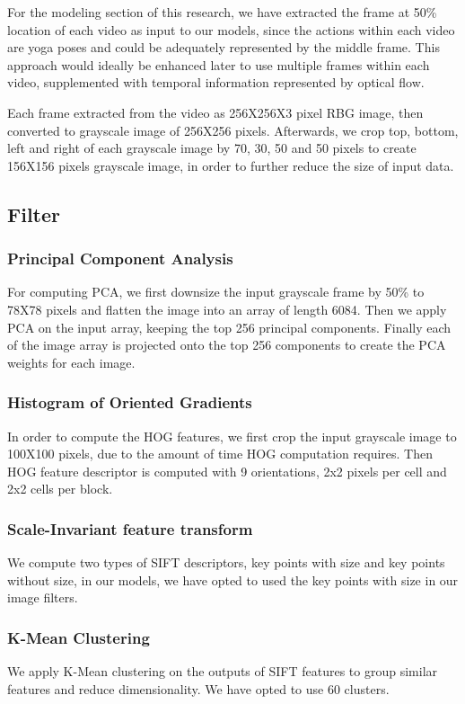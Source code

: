 \documentclass[
	a4paper, %
	10pt, %
	unnumberedsections, %
	twoside, %
]{t0004}
\begin{document}
For the modeling section of this research, we have extracted the frame at 50\% location of each video as input to our models, since the actions within each video are yoga poses and could be adequately represented by the middle frame. This approach would ideally be enhanced later to use multiple frames within each video, supplemented with temporal information represented by optical flow.

Each frame extracted from the video as 256X256X3 pixel RBG image, then converted to grayscale image of 256X256 pixels. Afterwards, we crop top, bottom, left and right of each grayscale image by 70, 30, 50 and 50 pixels to create 156X156 pixels grayscale image, in order to further reduce the size of input data.

\subsection{Filter}

\subsubsection{Principal Component Analysis} For computing PCA, we first downsize the input grayscale frame by 50\% to 78X78 pixels and flatten the image into an array of length 6084. Then we apply PCA on the input array, keeping the top 256 principal components. Finally each of the image array is projected onto the top 256 components to create the PCA weights for each image.

\subsubsection{Histogram of Oriented Gradients} In order to compute the HOG features, we first crop the input grayscale image to 100X100 pixels, due to the amount of time HOG computation requires. Then HOG feature descriptor is computed with 9 orientations, 2x2 pixels per cell and 2x2 cells per block.

\subsubsection{Scale-Invariant feature transform} We compute two types of SIFT descriptors, key points with size and key points without size, in our models, we have opted to used the key points with size in our image filters.

\subsubsection{K-Mean Clustering} We apply K-Mean clustering on the outputs of SIFT features to group similar features and reduce dimensionality. We have opted to use 60 clusters.
\end{document}

